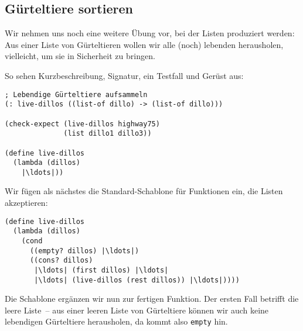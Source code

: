 \subsection{Gürteltiere sortieren}

Wir nehmen uns noch eine weitere Übung vor, bei der Listen produziert
werden: Aus einer Liste von Gürteltieren wollen wir alle (noch)
lebenden herausholen, vielleicht, um sie in Sicherheit zu bringen.

So sehen Kurzbeschreibung, Signatur, ein Testfall und Gerüst aus:
%
\begin{lstlisting}
; Lebendige Gürteltiere aufsammeln
(: live-dillos ((list-of dillo) -> (list-of dillo)))

(check-expect (live-dillos highway75)
              (list dillo1 dillo3))

(define live-dillos
  (lambda (dillos)
    |\ldots|))
\end{lstlisting}
%
Wir fügen als nächstes die Standard-Schablone für Funktionen ein, die
Listen akzeptieren:
%
\begin{lstlisting}
(define live-dillos
  (lambda (dillos)
    (cond
      ((empty? dillos) |\ldots|)
      ((cons? dillos)
       |\ldots| (first dillos) |\ldots|
       |\ldots| (live-dillos (rest dillos)) |\ldots|))))
\end{lstlisting}
%
Die Schablone ergänzen wir nun zur fertigen Funktion.  Der ersten
Fall betrifft die leere Liste~-- aus einer leeren Liste von
Gürteltiere können wir auch keine lebendigen Gürteltiere herausholen,
da kommt also \lstinline{empty} hin.

